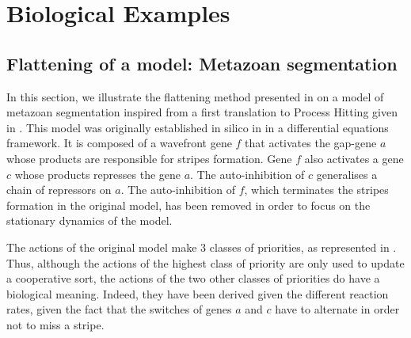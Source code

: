 
\section{Biological Examples}\label{sec:example}

\subsection{Flattening of a model: Metazoan segmentation}

In this section, we illustrate the flattening method presented in 
on a model of metazoan segmentation inspired from a first translation to Process Hitting given in \cite{PMR10-TCSB}.
This model was originally established in silico in \cite{MSB:MSB4100192} in a differential equations framework.
It is composed of a wavefront gene $f$ that activates the gap-gene $a$ whose products are responsible for stripes formation.
Gene $f$ also activates a gene $c$ whose products represses the gene $a$.
The auto-inhibition of $c$ generalises a chain of repressors on $a$.
The auto-inhibition of $f$, which terminates the stripes formation in the original model,
has been removed in order to focus on the stationary dynamics of the model.

The actions of the original model make $3$ classes of priorities, as represented in .
Thus, although the actions of the highest class of priority are only used to update a cooperative sort,
the actions of the two other classes of priorities do have a biological meaning.
Indeed, they have been derived given the different reaction rates,
given the fact that the switches of genes $a$ and $c$ have to alternate in order not to miss a stripe.

